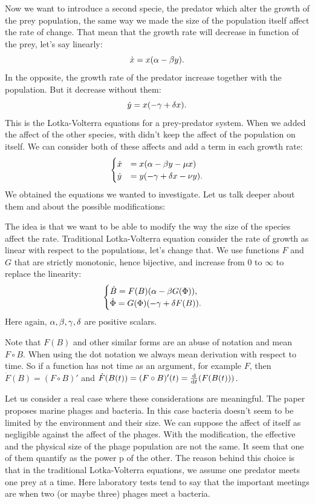 Now we want to introduce a second specie, the predator which alter the growth of the prey population, the same way we made the size of the population itself affect the rate of change. That mean that the growth rate will decrease in function of the prey, let's say linearly:
\[ \dot{x} = x(\alpha -\beta y).\]
In the opposite, the growth rate of the predator increase together with the population. But it decrease without them:
\[ \dot{y} = x(-\gamma +\delta x).\]
This is the Lotka-Volterra equations for a prey-predator system.
When we added the affect of the other species, with didn't keep the affect of the population on itself. We can consider both of these affects and add a term in each growth rate:
  \begin{equation*}
    \begin{cases}
    \dot{x} &= x(\alpha -\beta y - \mu x) \\
    \dot{y} &= y(-\gamma +\delta x - \nu y).
    \end{cases}
    \end{equation*}
We obtained the equations we wanted to investigate. Let us talk deeper about them and about the possible modifications:

The idea is that we want to be able to modify the way the size of the species affect the rate. Traditional Lotka-Volterra equation consider the rate of growth as linear with respect to the populations, let's change that. We use functions $F$ and $G$ that are strictly monotonic, hence bijective, and increase from $0$ to $\infty$ to replace the linearity:
\begin{equation} \label{eq:LV}
    \begin{cases}
    \dot{B} = F(B)(\alpha -\beta G(\Phi)), \\
    \dot{\Phi} = G(\Phi)(-\gamma +\delta F(B)).
    \end{cases}
\end{equation}
Here again, $\alpha,\beta,\gamma,\delta$ are positive scalars.

Note that $F(B)$ and other similar forms are an abuse of notation and mean $F\circ B$. When using the dot notation we always mean derivation with respect to time. So if a function has not time as an argument, for example $F$, then
$\dot{F}(B) = (F\circ B)'$ and $\dot{F}(B(t))= (F\circ B)'(t)=\frac{\mathrm{d}}{\mathrm{d} t}(F(B(t)))$.

Let us consider a real case where these considerations are meaningful.
The paper \cite{Gav} proposes marine phages and bacteria. In this case bacteria doesn't seem to be limited by the environment and their size. We can suppose the affect of itself as negligible against the affect of the phages. With the modification, the effective and the physical size of the phage population are not the same. It seem that one of them quantify as the power p of the other. The reason behind this choice is that in the traditional Lotka-Volterra equations, we assume one predator meets one prey at a time. Here laboratory tests tend to say that the important meetings are when two (or maybe three) phages meet a bacteria.

